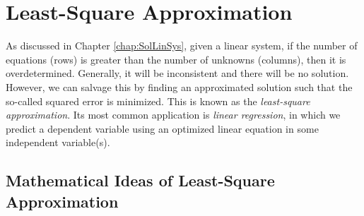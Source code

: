\chapter{Least-Square Approximation}
\label{chap:leastsq}

As discussed in Chapter \ref{chap:SolLinSys}, given a linear system, if the number of equations (rows) is greater than the number of unknowns (columns), then it is overdetermined. Generally, it will be inconsistent and there will be no solution. However, we can salvage this by finding an approximated solution such that the so-called squared error is minimized. This is known as the \textit{least-square approximation}. Its most common application is \textit{linear regression}, in which we predict a dependent variable using an optimized linear equation in some independent variable(s).

\section{Mathematical Ideas of Least-Square Approximation}

